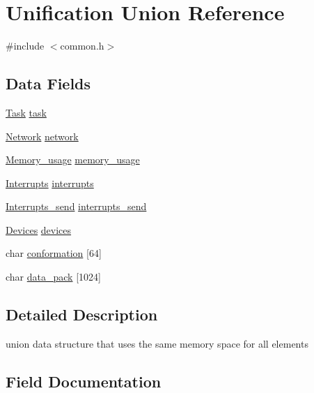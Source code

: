 \hypertarget{union_unification}{}\section{Unification Union Reference}
\label{union_unification}


{\ttfamily \#include $<$common.\+h$>$}

\subsection*{Data Fields}
\begin{DoxyCompactItemize}
\item 
\hyperlink{common_8h_a1d107d116293b1dddca4e5d3d2898d00}{Task} \hyperlink{union_unification_a8bcc572b9d73774627be66dd46aa61a8}{task}
\item 
\hyperlink{common_8h_a5e783e42eddc16b9eb807fe441e845e9}{Network} \hyperlink{union_unification_a2d9a64328e83ad37af17cbeb5e73b5df}{network}
\item 
\hyperlink{common_8h_ad1aed56b78add859fe08c0de057dee80}{Memory\+\_\+usage} \hyperlink{union_unification_a0d195ecd71403dc808aad5e3afe6e7e7}{memory\+\_\+usage}
\item 
\hyperlink{common_8h_a3252589b9348b042085b311aae270684}{Interrupts} \hyperlink{union_unification_ab342d93ebde06a9e9d859f79b5d2b6f9}{interrupts}
\item 
\hyperlink{common_8h_aba6b883ac9f10b90d4e9b160bb1f233b}{Interrupts\+\_\+send} \hyperlink{union_unification_aa483e870c9c6607cd35e04e435cb37b3}{interrupts\+\_\+send}
\item 
\hyperlink{common_8h_a2c6d82e48dafb528d22e1ab8b09637b2}{Devices} \hyperlink{union_unification_ac451518cc6db3023ae782d6456bd29c5}{devices}
\item 
char \hyperlink{union_unification_a51d4db27aea0ab484c4f111f9cebb890}{conformation} \mbox{[}64\mbox{]}
\item 
char \hyperlink{union_unification_a9dc75448acbba57f2e38cf112d2a0f5c}{data\+\_\+pack} \mbox{[}1024\mbox{]}
\end{DoxyCompactItemize}


\subsection{Detailed Description}
union data structure that uses the same memory space for all elements 

\subsection{Field Documentation}
